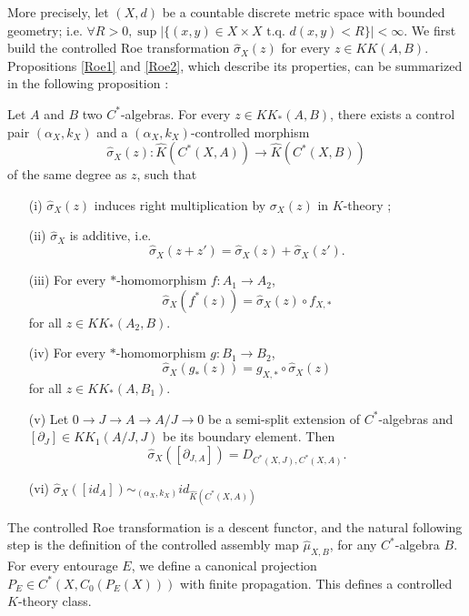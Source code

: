 More precisely, let $(X,d)$ be a countable discrete metric space with bounded geometry; i.e. $\forall R>0,\sup | \{ (x,y) \in X\times X \text{ t.q. }d(x,y)<R\} |<\infty$. We first build the controlled Roe transformation $\hat\sigma_X(z)$ for every $z\in KK(A,B)$. Propositions \ref{Roe1} and \ref{Roe2}, which describe its properties, can be summarized in the following proposition :

\begin{prop}
Let $A$ and $B$ two $C^*$-algebras. For every $z\in KK_*(A,B)$, there exists a control pair $(\alpha_X,k_X)$ and a $(\alpha_X,k_X)$-controlled morphism
\[\hat\sigma_X(z) : \hat K(C^*(X,A))\rightarrow \hat K(C^*(X,B))\]
of the same degree as $z$, such that
\begin{enumerate}
\item[(i)] $\hat\sigma_X(z)$ induces right multiplication by $\sigma_X(z)$ in $K$-theory ;
\item[(ii)] $\hat\sigma_X$ is additive, i.e.
\[\hat\sigma_X(z+z')=\hat\sigma_X(z)+\hat\sigma_X(z').\]
\item[(iii)] For every $*$-homomorphism $f : A_1\rightarrow A_2$,
\[\hat\sigma_X(f^*(z))=\hat\sigma_X(z)\circ f_{X,*}\] for all $z\in KK_*(A_2,B)$.
\item[(iv)] For every $*$-homomorphism $g : B_1\rightarrow B_2$,
\[\hat\sigma_X(g_*(z))= g_{X,*}\circ \hat\sigma_X(z)\] for all $z\in KK_*(A,B_1)$.
\item[(v)] Let $0\rightarrow J\rightarrow A\rightarrow A/J\rightarrow 0$ be a semi-split extension of $C^*$-algebras and $[\partial_J]\in KK_1(A/J,J)$ be its boundary element. Then 
\[\hat\sigma_X([\partial_{J,A}])=D_{C^*(X,J),C^*(X,A)}.\] 
\item[(vi)] $\hat\sigma_X([id_A]) \sim_{(\alpha_X,k_X)} id_{\hat K(C^*(X,A))}$
\end{enumerate}
\end{prop}

The controlled Roe transformation is a descent functor, and the natural following step is the definition of the controlled assembly map $\hat\mu_{X,B}$, for any $C^*$-algebra $B$. For every entourage $E$, we define a canonical projection $P_E\in C^*(X,C_0(P_E(X)))$ with finite propagation. This defines a controlled $K$-theory class.         

